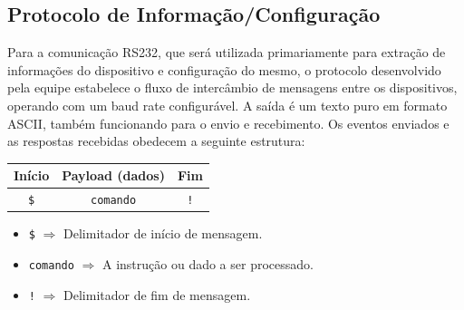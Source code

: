 \documentclass[a4paper, 12pt]{article}
\begin{document}
    \subsection{Protocolo de Informação/Configuração}
    
    Para a comunicação RS232, que será utilizada primariamente para extração de informações do dispositivo e configuração do mesmo, o protocolo desenvolvido pela equipe estabelece o fluxo de intercâmbio de mensagens entre os dispositivos, operando com um baud rate configurável. A saída é um texto puro em formato ASCII, também funcionando para o envio e recebimento. Os eventos enviados e as respostas recebidas obedecem a seguinte estrutura:

    \begin{center}
        \begin{tabular}{|c|c|c|}
        \hline
             \phantom{aa} Início \phantom{aa}  & \phantom{aa}  Payload (dados) \phantom{aa}  &  \phantom{aa} Fim \phantom{aa}   \\
        \hline
             \texttt{\$} & \texttt{comando} & \texttt{!} \\
        \hline
        \end{tabular}
    \end{center}

    \begin{itemize}
        \item \texttt{\$} $\Rightarrow$ Delimitador de início de mensagem.
        \item \texttt{comando} $\Rightarrow$ A instrução ou dado a ser processado.
        \item \texttt{!} $\Rightarrow$ Delimitador de fim de mensagem.
    \end{itemize}
\end{document}
